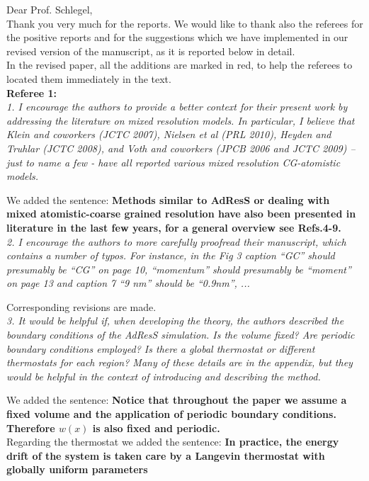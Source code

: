\documentclass[a4paper]{article}
\begin{document}
\noindent
Dear Prof. Schlegel,\\

Thank you very much for the reports. We would like to thank also the referees for the positive reports and for the suggestions which we have implemented in our revised version of the manuscript, as it is reported below in detail.\\

In the revised paper, all the additions are marked in red, to help the referees to located them immediately in the text.\\

\noindent
{\bf Referee 1:}\\

\textit{
1. I encourage the authors to provide a better context for their
present work by addressing the literature on mixed resolution
models. In particular, I believe that Klein and coworkers (JCTC 2007),
Nielsen et al (PRL 2010), Heyden and Truhlar (JCTC 2008), and Voth and
coworkers (JPCB 2006 and JCTC 2009) – just to name a few - have all
reported various mixed resolution CG-atomistic models.
}

We added the sentence: {\bf Methods similar to AdResS or dealing with mixed atomistic-coarse grained resolution have also been presented in literature in the last few years, for a general overview see Refs.4-9.}
\\

\textit{
2. I encourage the authors to more carefully proofread their
manuscript, which contains a number of typos. For instance, in the Fig
3 caption ``GC'' should presumably be ``CG'' on page 10, ``momentum'' should
presumably be ``moment'' on page 13 and caption 7 “9 nm” should be
``0.9nm'', ...
}

Corresponding revisions are made. 
\\

\textit{
3. It would be helpful if, when developing the theory, the authors
described the boundary conditions of the AdResS simulation. Is the
volume fixed? Are periodic boundary conditions employed? Is there a
global thermostat or different thermostats for each region? Many of
these details are in the appendix, but they would be helpful in the
context of introducing and describing the method.
}

We added the sentence: {\bf Notice that throughout the paper we assume a fixed volume and the application of periodic boundary conditions. Therefore $w(x)$ is also fixed and periodic.}\\
Regarding the thermostat we added the sentence: {\bf In practice, the energy drift of the system is taken care by a Langevin thermostat with globally uniform parameters}
\\
\end{document}
